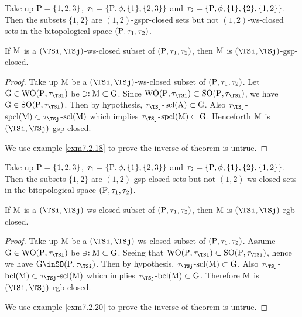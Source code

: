 \begin{exm}\label{exm7.2.16}
Take up $\mathrm{P}=\{1, 2, 3\}$, $\tau_1 =\{\mathrm{P}, \phi, \{1\}, \{ 2,3\}\}$ and $\tau_2 =\{\mathrm{P}, \phi, \{1\}, \{2\},\{1,2\}\}$. Then the subsets $\{1,2\}$ are $(1, 2)$-gspr-closed sets but not $(1, 2)$-ws-closed sets in the bitopological space $(\mathrm{P}, \tau_1 , \tau_2 )$.
\end{exm}

\begin{thm}\label{thm7.2.17}
If $\mathrm{M}$ is a $(\TSi, \TSj)$-ws-closed subset of $(\mathrm{P}, \tau_1 , \tau_2 )$, then $\mathrm{M}$ is $(\TSi, \TSj)$-gsp-closed.
\end{thm}

\begin{proof}
Take up $\mathrm{M}$ be a $(\TSi, \TSj)$-ws-closed subset of $(\mathrm{P}, \tau_1 , \tau_2)$. Let $\TSG\in\TSW\TSO(\TSP, \tau_{\TSi} )$ be $\ni: \mathrm{M} \subset \mathrm{G}$. Since $\TSW\TSO(\TSP, \tau_{\TSi}) \subset \TSS\TSO(\TSP, \tau_{\TSi})$, we have $\TSG\in\TSS\TSO(\TSP, \tau_{\TSi})$. Then by hypothesis, $\tau_{\TSj}$-$\mathrm{scl}(\mathrm{A}) \subset \mathrm{G}$. Also $\tau_{\TSj}$-$\spcl(\TSM) \subset \tau_{\TSj}$-$\mathrm{scl}(\mathrm{M})$ which implies $\tau_{\TSj}$-$\mathrm{spcl}(\mathrm{M}) \subset \mathrm{G}$. Henceforth $\mathrm{M}$ is $(\TSi, \TSj)$-gsp-closed.

We use example \ref{exm7.2.18} to prove the inverse of theorem is untrue.
\end{proof}

\begin{exm}\label{exm7.2.18}
Take up $\mathrm{P}=\{1,2,3\}$, $\tau_1 =\{\mathrm{P}, \phi, \{1\}, \{2, 3\}\}$ and $\tau_2 =\{\mathrm{P}, \phi, \{1\}, \{2\},\{1,2\}\}$. Then the subsets $\{1,2\}$ are $(1, 2)$-gsp-closed sets but not $(1, 2)$-ws-closed sets in the bitopological space $(\mathrm{P}, \tau_1 , \tau_2 )$.
\end{exm}

\begin{thm}\label{thm7.2.19}
If $\mathrm{M}$ is a $(\TSi, \TSj)$-ws-closed subset of $(\mathrm{P}, \tau_1 , \tau_2 )$, then $\mathrm{M}$ is $(\TSi, \TSj)$-rgb-closed.
\end{thm}

\begin{proof}
Take up $\mathrm{M}$ be a $(\TSi, \TSj)$-ws-closed subset of $(\mathrm{P}, \tau_1 , \tau_2 )$. Assume $\TSG\in\TSW\TSO(\TSP, \tau_{\TSi} )$ be $\ni: \mathrm{M} \subset\mathrm{G}$. Seeing that $\TSW\TSO(\TSP, \tau_{\TSi} ) \subset \TSS\TSO(\TSP, \tau_{\TSi} )$, hence we have $\TSG\inSO(\TSP, \tau_{\TSi} )$. Then by hypothesis, $\tau_{\TSj}$-$\mathrm{scl}(\mathrm{M}) \subset \mathrm{G}$. Also $\tau_{\TSj}$-$\bcl(\TSM) \subset \tau_{\TSj}$-$\mathrm{scl}(\mathrm{M})$ which implies $\tau_{\TSj}$-$\mathrm{bcl}(\mathrm{M}) \subset \mathrm{G}$. Therefore $\mathrm{M}$ is $(\TSi, \TSj)$-rgb-closed.

We use example \ref{exm7.2.20} to prove the inverse of theorem is untrue.
\end{proof}

